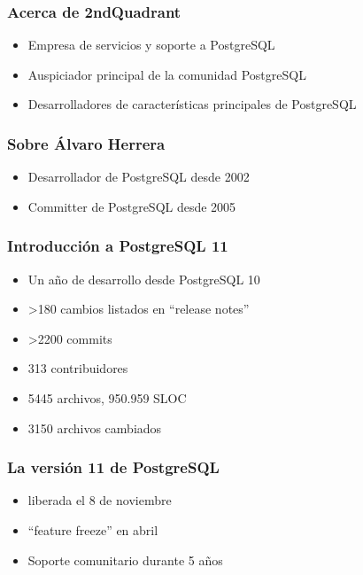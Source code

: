 \begin{frame}
\frametitle{Acerca de 2ndQuadrant}

\begin{itemize}
\item Empresa de servicios y soporte a PostgreSQL
\item Auspiciador principal de la comunidad PostgreSQL
\item Desarrolladores de características principales de PostgreSQL
\end{itemize}
\end{frame}

\begin{frame}
\frametitle{Sobre Álvaro Herrera}

\begin{itemize}
\item Desarrollador de PostgreSQL desde 2002
\item Committer de PostgreSQL desde 2005
\end{itemize}
\end{frame}

\begin{frame}
\frametitle{Introducción a PostgreSQL 11}

\begin{itemize}
\item Un año de desarrollo desde PostgreSQL 10
\item >180 cambios listados en ``release notes''
\item >2200 commits
\item 313 contribuidores
\item 5445 archivos, 950.959 SLOC
\item 3150 archivos cambiados
\end{itemize}
\end{frame}

\begin{frame}
\frametitle{La versión 11 de PostgreSQL}

\begin{itemize}
\item liberada el 8 de noviembre
\item ``feature freeze'' en abril
\item Soporte comunitario durante 5 años
\end{itemize}
\end{frame}

